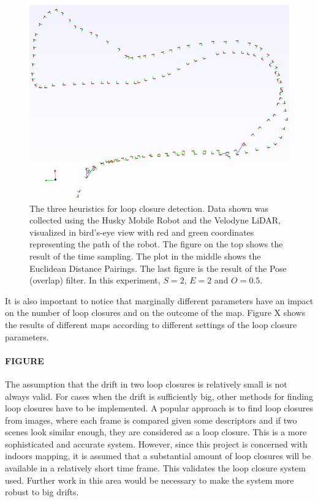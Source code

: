 \documentclass[11pt]{article}
\begin{document}
\begin{figure}
\begin{minipage}{0.67\textwidth}
\includegraphics[width=\textwidth]{LoopClosureFinal}
\end{minipage}\hfill
\begin{minipage}{0.33\textwidth}
\centering
\caption[t]{The three heuristics for loop closure detection. Data shown was collected using the Husky Mobile Robot and the Velodyne LiDAR, visualized in bird's-eye view with red and green coordinates representing the path of the robot. The figure on the top shows the result of the time sampling. The plot in the middle shows the Euclidean Distance Pairings. The last figure is the result of the Pose (overlap) filter. In this experiment, $S=2$, $E=2$ and $O=0.5$.}
\label{fig:loopClosureDetection}
\end{minipage}
\end{figure}

It is also important to notice that marginally different parameters have an impact on the number of loop closures and on the outcome of the map. Figure X shows the results of different maps according to different settings of the loop closure parameters.
		
	\paragraph{FIGURE}
	
The assumption that the drift in two loop closures is relatively small is not always valid. For cases when the drift is sufficiently big, other methods for finding loop closures have to be implemented. A popular approach is to find loop closures from images, where each frame is compared given some descriptors and if two scenes look similar enough, they are considered as a loop closure. This is a more sophisticated and accurate system. However, since this project is concerned with indoors mapping, it is assumed that a substantial amount of loop closures will be available in a relatively short time frame. This validates the loop closure system used. Further work in this area would be necessary to make the system more robust to big drifts.	
	
\end{document}
